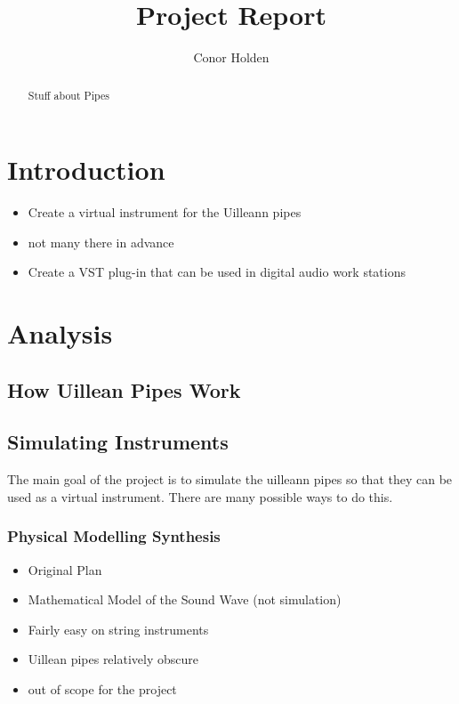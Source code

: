 \documentclass[12pt]{article}
\title{Project Report}
\author{Conor Holden }
\begin{document}
	
	\maketitle
	
	\begin{abstract}
	Stuff about Pipes
	
		
	\end{abstract}

	
	
	
	\tableofcontents
	
	
\section{Introduction}
	
	\begin{itemize}
		\item Create a virtual instrument for the Uilleann pipes
		\item not many there in advance
		\item Create a VST plug-in that can be used in digital audio work stations
	\end{itemize}
	
	
\section{Analysis}
	
	
	\subsection{How Uillean Pipes Work}	
	
	
	\subsection{ Simulating Instruments }
	The main goal of the project is to simulate the uilleann pipes so that they can be used as a virtual instrument. There are many possible ways to do this.
	
	
	\subsubsection{Physical Modelling Synthesis}
	\begin{itemize}
		\item Original Plan
		\item Mathematical Model of the Sound Wave (not simulation)
		\item Fairly easy on string instruments
		\item Uillean pipes relatively obscure
		\item out of scope for the project
	\end{itemize}
\end{document}
